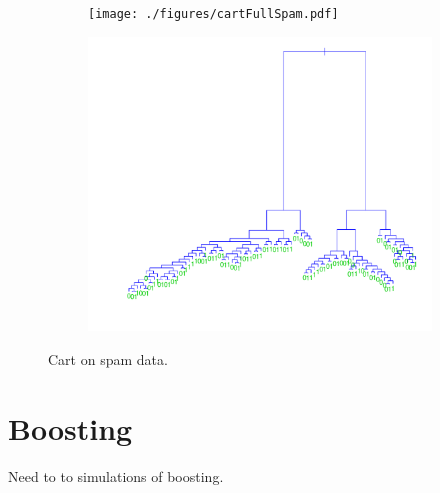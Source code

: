 \begin{figure}[h!]
  \centering
  \begin{subfigure}[b]{0.48\textwidth}
    \texttt{[image: ./figures/cartFullSpam.pdf]}
  \end{subfigure}%
  \quad
  \begin{subfigure}[b]{0.48\textwidth}
    \includegraphics[width=\textwidth]{./figures/cartOptSpam.pdf}
  \end{subfigure}
  \vspace{1\baselineskip}
  \caption{Cart on spam data.}
  \label{fig:CartSpam}
\end{figure}




\section{Boosting}
\label{sec:SimBoosting}
Need to to simulations of boosting.

